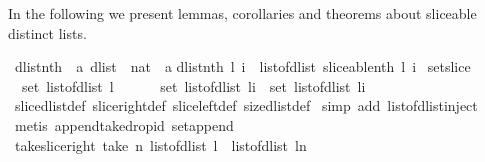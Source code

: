 \begin{isabellebody}
\isamarkupfalse%
%
\endisatagproof
{\isafoldproof}%
%
\isadelimproof
%
\endisadelimproof
\isanewline
\isanewline
{}\isamarkupfalse%
%
\isamarkuptrue%
%
\begin{isamarkuptext}%
In the following we present lemmas, corollaries and theorems about sliceable distinct lists.%
\end{isamarkuptext}\isamarkuptrue%
\isamarkupfalse%
\ dlist{\isacharunderscore}nth\ {\isacharcolon}{\isacharcolon}\ {\isachardoublequoteopen}{\isacharprime}a\ dlist\ {\isasymRightarrow}\ nat\ {\isasymRightarrow}\ {\isacharprime}a{\isachardoublequoteclose}\isanewline
{}\isanewline
{\isachardoublequoteopen}dlist{\isacharunderscore}nth\ l\ i\ {\isasymequiv}\ {\isacharparenleft}list{\isacharunderscore}of{\isacharunderscore}dlist\ {\isacharparenleft}sliceable{\isacharunderscore}nth\ l\ i{\isacharparenright}{\isacharparenright}{\isacharbang}{}{\isachardoublequoteclose}\isanewline
\isanewline
{}\isamarkupfalse%
\ set{\isacharunderscore}slice\ {\isacharcolon}\ \isanewline
\ \ {\isachardoublequoteopen}set\ {\isacharparenleft}list{\isacharunderscore}of{\isacharunderscore}dlist\ l{\isacharparenright}\ {\isacharequal}\ \isanewline
\ \ \ \ set\ {\isacharparenleft}list{\isacharunderscore}of{\isacharunderscore}dlist\ {\isacharparenleft}l{\isasymdagger}{\isachardot}{\isachardot}i{\isacharparenright}{\isacharparenright}\ {\isasymunion}\ set\ {\isacharparenleft}list{\isacharunderscore}of{\isacharunderscore}dlist\ {\isacharparenleft}l{\isasymdagger}i{\isachardot}{\isachardot}{\isacharparenright}{\isacharparenright}{\isachardoublequoteclose}\isanewline
%
\isadelimproof
%
\endisadelimproof
%
\isatagproof
{}\isamarkupfalse%
\ slice{\isacharunderscore}dlist{\isacharunderscore}def\ slice{\isacharunderscore}right{\isacharunderscore}def\ slice{\isacharunderscore}left{\isacharunderscore}def\ size{\isacharunderscore}dlist{\isacharunderscore}def\isanewline
{}\isamarkupfalse%
\ {\isacharparenleft}simp\ add{\isacharcolon}\ list{\isacharunderscore}of{\isacharunderscore}dlist{\isacharunderscore}inject{\isacharparenright}\isanewline
{}\isamarkupfalse%
\ {\isacharparenleft}metis\ append{\isacharunderscore}take{\isacharunderscore}drop{\isacharunderscore}id\ set{\isacharunderscore}append{\isacharparenright}%
\endisatagproof
{\isafoldproof}%
%
\isadelimproof
\isanewline
%
\endisadelimproof
\isanewline
{}\isamarkupfalse%
\ take{\isacharunderscore}slice{\isacharunderscore}right{\isacharcolon}\ {\isachardoublequoteopen}take\ n\ {\isacharparenleft}list{\isacharunderscore}of{\isacharunderscore}dlist\ l{\isacharparenright}\ {\isacharequal}\ list{\isacharunderscore}of{\isacharunderscore}dlist\ {\isacharparenleft}l{\isasymdagger}{\isachardot}{\isachardot}n{\isacharparenright}{\isachardoublequoteclose}\isanewline

\end{isabellebody}
